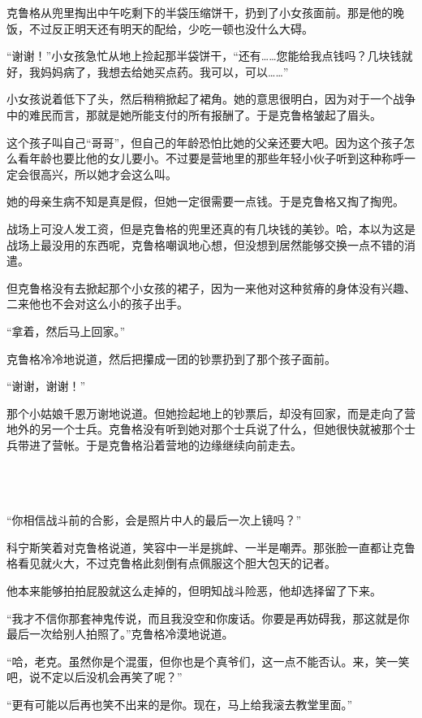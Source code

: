 克鲁格从兜里掏出中午吃剩下的半袋压缩饼干，扔到了小女孩面前。那是他的晚饭，不过反正明天还有明天的配给，少吃一顿也没什么大碍。

“谢谢！”小女孩急忙从地上捡起那半袋饼干，“还有……您能给我点钱吗？几块钱就好，我妈妈病了，我想去给她买点药。我可以，可以……”

小女孩说着低下了头，然后稍稍掀起了裙角。她的意思很明白，因为对于一个战争中的难民而言，那就是她所能支付的所有报酬了。于是克鲁格皱起了眉头。

这个孩子叫自己“哥哥”，但自己的年龄恐怕比她的父亲还要大吧。因为这个孩子怎么看年龄也要比他的女儿要小。不过要是营地里的那些年轻小伙子听到这种称呼一定会很高兴，所以她才会这么叫。

她的母亲生病不知是真是假，但她一定很需要一点钱。于是克鲁格又掏了掏兜。

战场上可没人发工资，但是克鲁格的兜里还真的有几块钱的美钞。哈，本以为这是战场上最没用的东西呢，克鲁格嘲讽地心想，但没想到居然能够交换一点不错的消遣。

但克鲁格没有去掀起那个小女孩的裙子，因为一来他对这种贫瘠的身体没有兴趣、二来他也不会对这么小的孩子出手。

“拿着，然后马上回家。”

克鲁格冷冷地说道，然后把攥成一团的钞票扔到了那个孩子面前。

“谢谢，谢谢！”

那个小姑娘千恩万谢地说道。但她捡起地上的钞票后，却没有回家，而是走向了营地外的另一个士兵。克鲁格没有听到她对那个士兵说了什么，但她很快就被那个士兵带进了营帐。于是克鲁格沿着营地的边缘继续向前走去。

 \section*{}

“你相信战斗前的合影，会是照片中人的最后一次上镜吗？”

科宁斯笑着对克鲁格说道，笑容中一半是挑衅、一半是嘲弄。那张脸一直都让克鲁格看见就火大，不过克鲁格此刻倒有点佩服这个胆大包天的记者。

他本来能够拍拍屁股就这么走掉的，但明知战斗险恶，他却选择留了下来。

“我才不信你那套神鬼传说，而且我没空和你废话。你要是再妨碍我，那这就是你最后一次给别人拍照了。”克鲁格冷漠地说道。

“哈，老克。虽然你是个混蛋，但你也是个真爷们，这一点不能否认。来，笑一笑吧，说不定以后没机会再笑了呢？”

“更有可能以后再也笑不出来的是你。现在，马上给我滚去教堂里面。”

